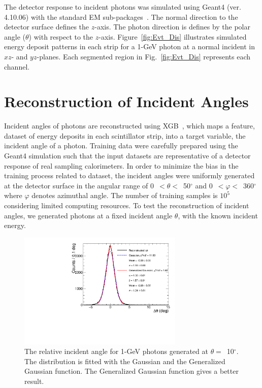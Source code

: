\documentclass[preprint,12pt,times,a4paper]{elsarticle}
\begin{document}
The detector response to incident photons was simulated using Geant4 (ver. 4.10.06) with the standard EM sub-packages~\cite{GEANT4}. The normal direction to the detector surface defines the $z$-axis. The photon direction is defines by the polar angle ($\theta$) with respect to the $z$-axis. Figure~\ref{fig:Evt_Dis} illustrates simulated energy deposit patterns in each strip for a 1-GeV photon at a normal incident in $xz$- and $yz$-planes. Each segmented region in Fig.~\ref{fig:Evt_Dis} represents each channel.

\section{Reconstruction of Incident Angles}
\label{sec:res}

Incident angles of photons are reconstructed using XGB~\cite{xgboost:2016}, which maps a feature, dataset of energy deposits in each scintillator strip, into a target variable, the incident angle of a photon. Training data were carefully prepared using the Geant4 simulation such that the input datasets are representative of a detector response of real sampling calorimeters. In order to minimize the bias in the training process related to dataset, the incident angles were uniformly generated at the detector surface in the angular range of 0~$<\theta<$~50$^{\circ}$ and 0~$<\varphi<$~360$^{\circ}$ where $\varphi$ denotes azimuthal angle. The number of training samples is $10^{5}$ considering limited computing resources. To test the reconstruction of incident angles, we generated photons at a fixed incident angle $\theta$, with the known incident energy.

\begin{figure}[!hbt]
\centering
\includegraphics[width=0.7\textwidth]{figures/Fig3_fit_GG.pdf}
\caption{ The relative incident angle for 1-GeV photons generated at $\theta=$~10$^{\circ}$. The distribution is fitted with the Gaussian and the Generalized Gaussian function. The Generalized Gaussian function gives a better result.}
\label{fig:angle_10degree}
\end{figure}
\end{document}
